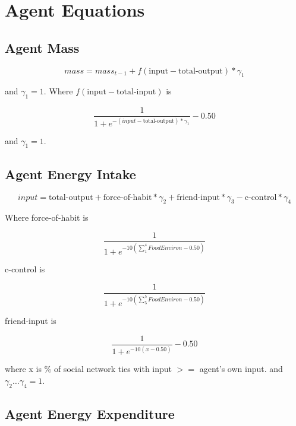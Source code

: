 \documentclass[12pt]{article}
\begin{document}
\section{Agent Equations}

\subsection{Agent Mass}

\begin{equation}
mass = mass_{t-1} + f(\text{input} - \text{total-output}) * \gamma_1
\end{equation}

and $\gamma_1 = 1$. Where $f(\text{input} - \text{total-input})$ is

\begin{equation}
\frac{1}{1 + e^{-(input - \text{total-output}) * \gamma_1}} - 0.50
\end{equation}

and $\gamma_1 = 1$.


\subsection{Agent Energy Intake}

\begin{equation}
input = \text{total-output} + \text{force-of-habit} * \gamma_2 + \text{friend-input} * \gamma_3 - \text{c-control}* \gamma_4
\end{equation}

Where force-of-habit is

\begin{equation}
\frac{1}{1 + e^{-10(\sum_{1}^{4}FoodEnviron - 0.50)}}
\end{equation}

c-control is

\begin{equation}
\frac{1}{1 + e^{-10(\sum_{5}^{5}FoodEnviron - 0.50)}}
\end{equation}

friend-input is

\begin{equation}
\frac{1}{1 + e^{-10(x - 0.50)}} - 0.50
\end{equation}

where x is \% of social network ties with input $>=$ agent's own input. and $ \gamma_2 \ldots \gamma_4 = 1$.

\subsection{Agent Energy Expenditure}
\end{document}
